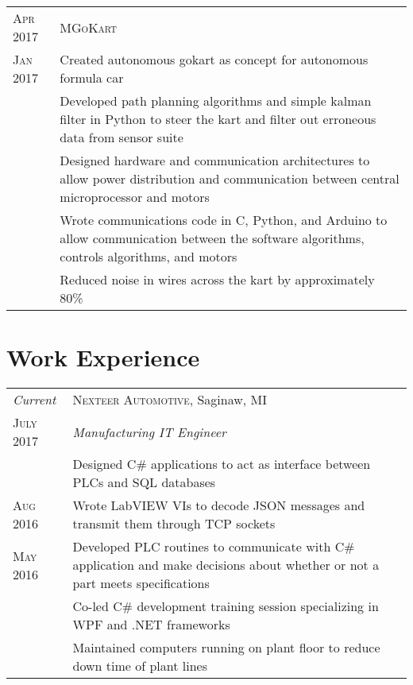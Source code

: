 \documentclass[a4paper,12pt]{article} %
\begin{document}
\begin{tabular}{R{2.1cm}|p{15.5cm}}
\hspace{4pt}\textsc{Apr 2017} & \textsc{MGoKart} \\
\textsc{Jan 2017} & \footnotesize{Created autonomous gokart as concept for autonomous formula car} \\
& \footnotesize{Developed path planning algorithms and simple kalman filter in
  Python to steer the kart and filter out erroneous data from sensor suite} \\
& \footnotesize{Designed hardware and communication architectures to allow
  power distribution and communication between central microprocessor and motors} \\
& \footnotesize{Wrote communications code in C, Python, and Arduino to allow
  communication between the software algorithms, controls algorithms, and motors} \\
& \footnotesize{Reduced noise in wires across the kart by approximately 80\%} \\
\end{tabular}


\section{Work Experience}

\begin{tabular}{R{2.1cm}|p{15.5cm}}
\emph{Current} & \textsc{Nexteer Automotive}, Saginaw, MI \\
\textsc{July 2017} & \emph{Manufacturing IT Engineer} \\
& \footnotesize{Designed C\# applications to act as interface
  between PLCs and SQL databases} \\
\textsc{Aug 2016} & \footnotesize{Wrote LabVIEW VIs to decode JSON messages
  and transmit them through TCP sockets}\\
\textsc{May 2016} & \footnotesize{Developed PLC routines to communicate with C\#
  application and make decisions about whether or not a part meets specifications} \\
& \footnotesize{Co-led C\# development training session specializing in WPF and .NET frameworks}\\
& \footnotesize{Maintained computers running on plant floor to reduce down time
  of plant lines} \\
\end{tabular}
\end{document}
